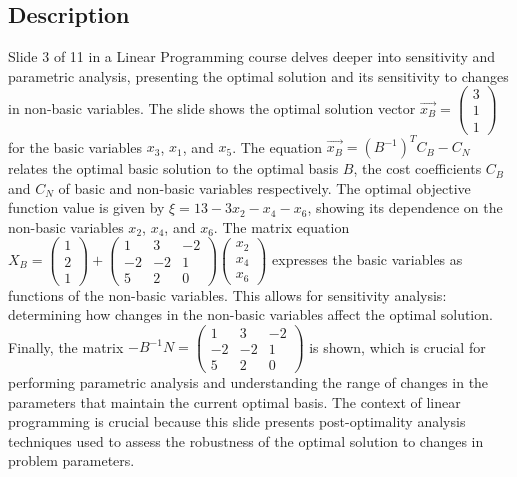 \documentclass{article}%
\begin{document}
\subsection{Description}%
Slide 3 of 11 in a Linear Programming course delves deeper into sensitivity and parametric analysis, presenting the optimal solution and its sensitivity to changes in non-basic variables. The slide shows the optimal solution vector $\vec{x_B} = \begin{pmatrix} 3 \\ 1 \\ 1 \end{pmatrix}$ for the basic variables $x_3$, $x_1$, and $x_5$.  The equation $\vec{x_B} = (B^{-1})^T C_B - C_N$ relates the optimal basic solution to the optimal basis $B$, the cost coefficients $C_B$ and $C_N$ of basic and non-basic variables respectively. The optimal objective function value is given by $\xi = 13 - 3x_2 - x_4 - x_6$, showing its dependence on the non-basic variables $x_2$, $x_4$, and $x_6$.  The matrix equation $X_B = \begin{pmatrix} 1 \\ 2 \\ 1 \end{pmatrix} + \begin{pmatrix} 1 & 3 & -2 \\ -2 & -2 & 1 \\ 5 & 2 & 0 \end{pmatrix} \begin{pmatrix} x_2 \\ x_4 \\ x_6 \end{pmatrix}$ expresses the basic variables as functions of the non-basic variables. This allows for sensitivity analysis: determining how changes in the non-basic variables affect the optimal solution. Finally, the matrix $-B^{-1}N = \begin{pmatrix} 1 & 3 & -2 \\ -2 & -2 & 1 \\ 5 & 2 & 0 \end{pmatrix}$ is shown, which is crucial for performing parametric analysis and understanding the range of changes in the parameters that maintain the current optimal basis. The context of linear programming is crucial because this slide presents post-optimality analysis techniques used to assess the robustness of the optimal solution to changes in problem parameters.%
\end{document}
